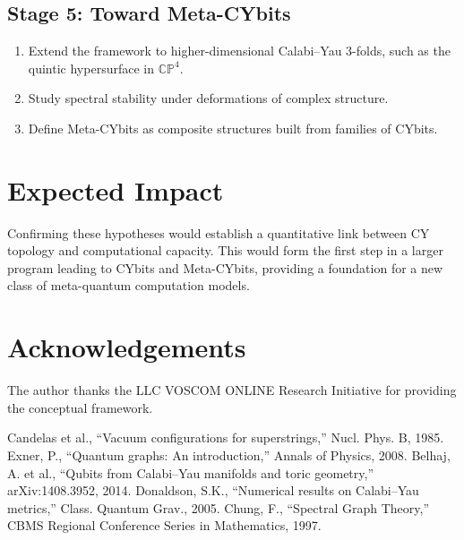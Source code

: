 \documentclass[12pt,a4paper]{article}
\begin{document}
\subsection{Stage 5: Toward Meta-CYbits}
\begin{enumerate}
\item Extend the framework to higher-dimensional Calabi--Yau 3-folds, 
such as the quintic hypersurface in $\mathbb{CP}^4$.  
\item Study spectral stability under deformations of complex structure.  
\item Define Meta-CYbits as composite structures built from families of CYbits.  
\end{enumerate}

\section{Expected Impact}
Confirming these hypotheses would establish 
a quantitative link between CY topology and computational capacity. 
This would form the first step in a larger program 
leading to CYbits and Meta-CYbits, 
providing a foundation for a new class of meta-quantum computation models.  

\section*{Acknowledgements}
The author thanks the LLC VOSCOM ONLINE Research Initiative 
for providing the conceptual framework.

\begin{thebibliography}{9}
Candelas et al., ``Vacuum configurations for superstrings,'' 
Nucl. Phys. B, 1985.
Exner, P., ``Quantum graphs: An introduction,'' 
Annals of Physics, 2008.
Belhaj, A. et al., ``Qubits from Calabi--Yau manifolds and toric geometry,'' 
arXiv:1408.3952, 2014.
Donaldson, S.K., ``Numerical results on Calabi--Yau metrics,'' 
Class. Quantum Grav., 2005.
Chung, F., ``Spectral Graph Theory,'' 
CBMS Regional Conference Series in Mathematics, 1997.
\end{thebibliography}
\end{document}

